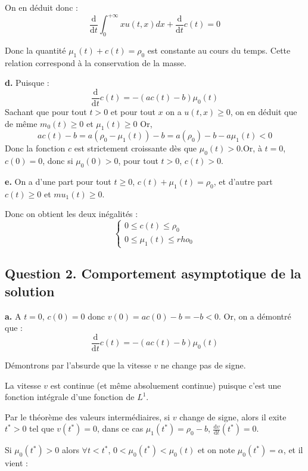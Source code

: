 \documentclass[a4paper]{article}
\newcommand{\dep}{b}
\begin{document}
On en déduit donc :
\[ \displaystyle \frac{\mathrm{d}}{\mathrm{d} t} \int_0^{+\infty} x u(t,x)dx
+ \frac{\mathrm{d}}{\mathrm{d} t} c(t) = 0 \]

Donc la quantité $\mu_1(t) +c(t) = \rho_0$ est constante au cours du temps.
Cette relation correspond à la conservation de la masse.

\textbf{d.} 
	Puisque :
	\[\displaystyle \frac{\mathrm{d}}{\mathrm{d} t} c(t) = -(ac(t)-b)\mu_0(t)\]
	Sachant que pour tout $t>0$ et pour tout $x$ on a $u(t,x)\geq 0$,
	on en déduit que de même $m_0(t) \geq 0$ et $\mu_1(t)\geq 0$
	Or, 
	\[ ac(t)-b = a(\rho_0 - \mu_1(t))-b = a(\rho_0)-b - a\mu_1(t) <0 \]
	Donc la fonction $c$ est strictement croissante dès que $\mu_0(t)>0$.Or, à $t=0$,   $c(0)=0$,
	donc si $\mu_0(0)>0$, pour tout $t>0$, $c(t)> 0$.

\textbf{e.}
On a d'une part pour tout $t\geq 0$, $c(t)+\mu_1(t) = \rho_0$, et d'autre part $c(t)\geq 0$ et $mu_1(t)\geq 0$.

Donc on obtient les deux inégalités :
\[
\begin{cases}
	0 \leq c(t) \leq \rho_0 \\
	0 \leq \mu_1(t) \leq rho_0
\end{cases}
\]


\subsection*{Question 2. Comportement asymptotique de la solution}

\textbf{a.}
A $t=0$, $c(0) = 0$ donc $v(0) = ac(0) -b = -b <0$.
Or, on a démontré que :
\[\displaystyle \frac{\mathrm{d}}{\mathrm{d} t} c(t) = -(ac(t)-b)\mu_0(t)\]

Démontrons par l'absurde que la vitesse $v$ ne change pas de signe.

La vitesse $v$ est continue (et même absoluement continue)
puisque c'est une fonction intégrale d'une fonction de $L^1$.

Par le théorème des valeurs intermédiaires, si $v$ change de signe,
alors il exite $t^*>0$ tel que $v(t^*)= 0$, 
	dans ce cas $\mu_1(t^*)= \rho_0 -\dep $, 
	$\frac{\mathrm{d} v }{\mathrm{d}t} (t^*) = 0$.
	
	Si $\mu_0(t^*)>0$ alors $\forall t<t^*$, $0<\mu_0(t^*)<\mu_0(t)$ et on note $ \mu_0(t^*)= \alpha$, et il vient :
	
\end{document}
